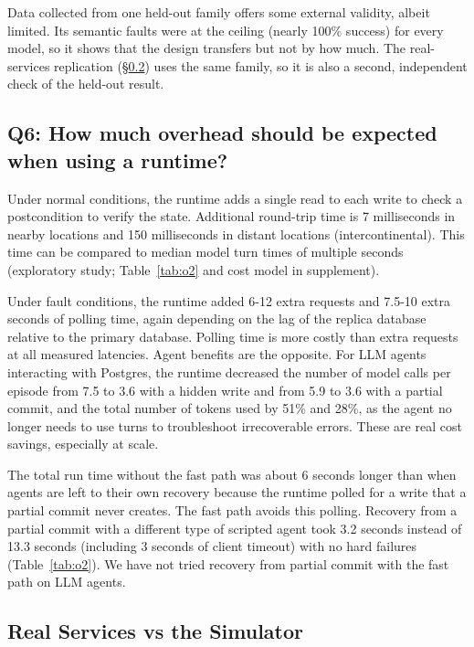 \documentclass[letterpaper,twocolumn,10pt]{article}
\begin{document}
Data collected from one held-out family offers some external validity, albeit limited. Its semantic faults were at the ceiling (nearly 100\% success) for every model, so it shows that the design transfers but not by how much. The real-services replication (\S\ref{sec:7.7}) uses the same family, so it is also a second, independent check of the held-out result.

\subsection{Q6: How much overhead should be expected when using a runtime?}\label{sec:7.6}

Under normal conditions, the runtime adds a single read to each write to check a postcondition to verify the state. Additional round-trip time is 7 milliseconds in nearby locations and 150 milliseconds in distant locations (intercontinental). This time can be compared to median model turn times of multiple seconds (exploratory study; Table~\ref{tab:o2} and cost model in supplement).

Under fault conditions, the runtime added 6-12 extra requests and 7.5-10 extra seconds of polling time, again depending on the lag of the replica database relative to the primary database. Polling time is more costly than extra requests at all measured latencies. Agent benefits are the opposite. For LLM agents interacting with Postgres, the runtime decreased the number of model calls per episode from 7.5 to 3.6 with a hidden write and from 5.9 to 3.6 with a partial commit, and the total number of tokens used by 51\% and 28\%, as the agent no longer needs to use turns to troubleshoot irrecoverable errors. These are real cost savings, especially at scale.

The total run time without the fast path was about 6 seconds longer than when agents are left to their own recovery because the runtime polled for a write that a partial commit never creates. The fast path avoids this polling. Recovery from a partial commit with a different type of scripted agent took 3.2 seconds instead of 13.3 seconds (including 3 seconds of client timeout) with no hard failures (Table~\ref{tab:o2}). We have not tried recovery from partial commit with the fast path on LLM agents.

\subsection{Real Services vs the Simulator}\label{sec:7.7}
\end{document}
